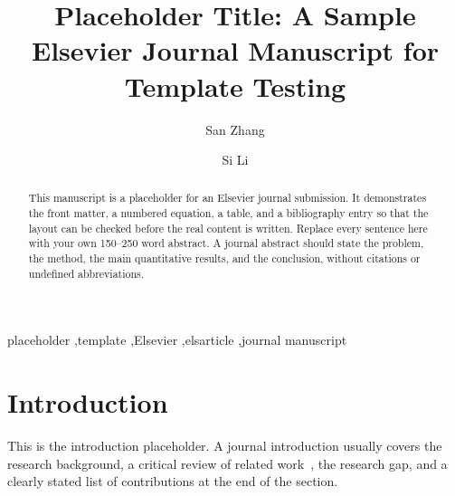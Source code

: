 \documentclass[preprint,review,12pt]{elsarticle}
\begin{document}
\begin{frontmatter}

\title{Placeholder Title: A Sample Elsevier Journal Manuscript for Template Testing}

\author[inst1]{San Zhang}

\author[inst2]{Si Li}



\begin{abstract}
This manuscript is a placeholder for an Elsevier journal submission. It demonstrates the
front matter, a numbered equation, a table, and a bibliography entry so that the layout
can be checked before the real content is written. Replace every sentence here with your
own 150--250 word abstract. A journal abstract should state the problem, the method, the
main quantitative results, and the conclusion, without citations or undefined abbreviations.
\end{abstract}

\begin{keyword}
placeholder \sep template \sep Elsevier \sep elsarticle \sep journal manuscript
\end{keyword}

\end{frontmatter}

\linenumbers

\section{Introduction}
\label{sec:intro}

This is the introduction placeholder. A journal introduction usually covers the research
background, a critical review of related work~\cite{lecun2015deep,he2016resnet}, the
research gap, and a clearly stated list of contributions at the end of the section.
\end{document}
